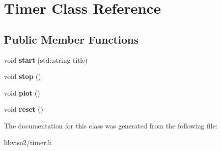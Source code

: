 \hypertarget{class_timer}{\section{Timer Class Reference}
\label{class_timer}
}
\subsection*{Public Member Functions}
\begin{DoxyCompactItemize}
\item 
\hypertarget{class_timer_a483491cfb75be6f7466c5637a602b54f}{void {\bfseries start} (std\+::string title)}\label{class_timer_a483491cfb75be6f7466c5637a602b54f}

\item 
\hypertarget{class_timer_a63f0eb44b27402196590a03781515dba}{void {\bfseries stop} ()}\label{class_timer_a63f0eb44b27402196590a03781515dba}

\item 
\hypertarget{class_timer_a882129bf76094abcd8972c9d3855359c}{void {\bfseries plot} ()}\label{class_timer_a882129bf76094abcd8972c9d3855359c}

\item 
\hypertarget{class_timer_a9020542d73357a4eef512eefaf57524b}{void {\bfseries reset} ()}\label{class_timer_a9020542d73357a4eef512eefaf57524b}

\end{DoxyCompactItemize}


The documentation for this class was generated from the following file\+:\begin{DoxyCompactItemize}
\item 
libviso2/timer.\+h\end{DoxyCompactItemize}
